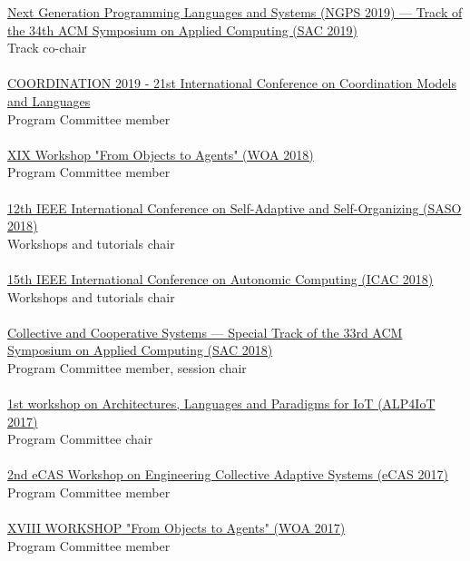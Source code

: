  
\href{https://ngps2019.github.io/}{Next Generation Programming Languages and Systems (NGPS 2019) --- Track of the 34th ACM Symposium on Applied Computing (SAC 2019)}
\\ Track co-chair \\
\halfblankline \\
\href{http://www.discotec.org/2019/coordination}{COORDINATION 2019 - 21st International Conference on Coordination Models and Languages}
\\ Program Committee member \\
\halfblankline \\
\href{http://diid.unipa.it/roboticslab/woa2018/}{XIX Workshop "From Objects to Agents" (WOA 2018)}
\\ Program Committee member \\
\halfblankline \\
\href{https://saso2018.fbk.eu/}{12th IEEE International Conference on Self-Adaptive and Self-Organizing (SASO 2018)}
\\ Workshops and tutorials chair \\
\halfblankline \\
\href{http://icac2018.informatik.uni-wuerzburg.de/committees/organization-committee/}{15th IEEE International Conference on Autonomic Computing (ICAC 2018)}
\\ Workshops and tutorials chair \\
\halfblankline \\
\href{http://sac-cas2018.apice.unibo.it/referees.html}{Collective and Cooperative Systems --- Special Track of the 33rd ACM Symposium on Applied Computing (SAC 2018)}
\\ Program Committee member, session chair \\
\halfblankline \\
\href{http://apice.unibo.it/xwiki/bin/view/ALP4IoT2016/WebHome}{1st workshop on Architectures, Languages and Paradigms for IoT (ALP4IoT 2017)}
\\ Program Committee chair \\
\halfblankline \\
\href{http://apice.unibo.it/xwiki/bin/view/ECAS2017/WebHome}{2nd eCAS Workshop on Engineering Collective Adaptive Systems (eCAS 2017)}
\\ Program Committee member \\
\halfblankline \\
\href{http://woa2017.unirc.it/}{XVIII WORKSHOP "From Objects to Agents" (WOA 2017)}
\\ Program Committee member \\
